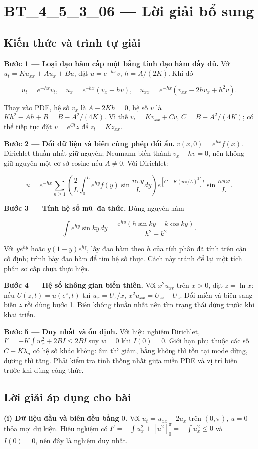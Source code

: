 \documentclass[10pt,a4paper]{article}
\begin{document}
\section*{BT\_4\_5\_3\_06 — Lời giải bổ sung}
\subsection*{Kiến thức và trình tự giải}
\textbf{Bước 1 — Loại đạo hàm cấp một bằng tính đạo hàm đầy đủ.} Với $u_t=Ku_{xx}+Au_x+Bu$, đặt $u=e^{-hx}v$, $h=A/(2K)$. Khi đó


\[
u_t=e^{-hx}v_t,\quad u_x=e^{-hx}(v_x-hv),\quad
u_{xx}=e^{-hx}(v_{xx}-2hv_x+h^2v).
\]


Thay vào PDE, hệ số $v_x$ là $A-2Kh=0$, hệ số $v$ là $Kh^2-Ah+B=B-A^2/(4K)$. Vì thế $v_t=Kv_{xx}+Cv$, $C=B-A^2/(4K)$; có thể tiếp tục đặt $v=e^{Ct}z$ để $z_t=Kz_{xx}$.

\textbf{Bước 2 — Đổi dữ liệu và biên cùng phép đổi ẩn.} $v(x,0)=e^{hx}f(x)$. Dirichlet thuần nhất giữ nguyên; Neumann biến thành $v_x-hv=0$, nên không giữ nguyên một cơ sở cosine nếu $A\ne0$. Với Dirichlet:


\[
u=e^{-hx}\sum_{n\ge1}\left(\frac2L\int_0^Le^{hy}f(y)\sin\frac{n\pi y}Ldy\right)
e^{[C-K(n\pi/L)^2]t}\sin\frac{n\pi x}L.
\]


\textbf{Bước 3 — Tính hệ số mũ–đa thức.} Dùng nguyên hàm


\[
\int e^{hy}\sin ky\,dy
=\frac{e^{hy}(h\sin ky-k\cos ky)}{h^2+k^2}.
\]


Với $y e^{hy}$ hoặc $y(1-y)e^{hy}$, lấy đạo hàm theo $h$ của tích phân đã tính trên cận cố định; trình bày đạo hàm để tìm hệ số thực. Cách này tránh để lại một tích phân sơ cấp chưa thực hiện.

\textbf{Bước 4 — Hệ số không gian biến thiên.} Với $x^2u_{xx}$ trên $x>0$, đặt $z=\ln x$: nếu $U(z,t)=u(e^z,t)$ thì $u_x=U_z/x$, $x^2u_{xx}=U_{zz}-U_z$. Đổi miền và biên sang biến $z$ rồi dùng bước 1. Biên không thuần nhất nên tìm trạng thái dừng trước khi khai triển.

\textbf{Bước 5 — Duy nhất và ổn định.} Với hiệu nghiệm Dirichlet, $I'=-K\int w_x^2+2BI\le2BI$ suy $w=0$ khi $I(0)=0$. Giới hạn phụ thuộc các số $C-K\lambda_n$ có hệ số khác không: âm thì giảm, bằng không thì tồn tại mode dừng, dương thì tăng. Phải kiểm tra tính thống nhất giữa miền PDE và vị trí biên trước khi dùng công thức.
\subsection*{Lời giải áp dụng cho bài}
\textbf{(i) Dữ liệu đầu và biên đều bằng $0$.}
Với $u_t=u_{xx}+2u_x$ trên $(0,\pi)$, $u=0$ thỏa mọi dữ kiện. Hiệu nghiệm có $I'=-\int u_x^2+[u^2]_0^\pi=-\int u_x^2\le0$ và $I(0)=0$, nên đây là nghiệm duy nhất.
\end{document}
